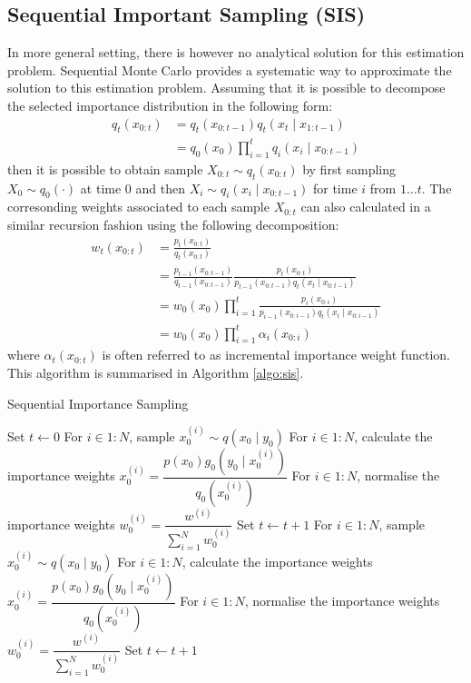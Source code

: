 \subsection{Sequential Important Sampling (SIS)}
In more general setting, there is however no analytical solution for this estimation problem. Sequential Monte Carlo provides a systematic way to approximate the solution to this estimation problem. Assuming that it is possible to decompose the selected importance distribution in the following form:
\begin{align}
	q_t(x_{0:t}) &= q_t(x_{0:t-1}) q_t(x_t \mid x_{1:t-1}) \nonumber \\
	             &= q_0(x_0) \prod^t_{i=1} q_i(x_i \mid x_{0:t-1})
\end{align}
then it is possible to obtain sample ${X_{0:t}} \sim q_t(x_{0:t})$ by first sampling $X_0 \sim q_0(\cdot)$ at time $0$ and then $X_i \sim q_i(x_i \mid x_{0:t-1})$ for time $i$ from $1 \ldots t$. The corresonding weights associated to each sample $X_{0:t}$ can also calculated in a similar recursion fashion using the following decomposition:
\begin{align}
  w_t(x_{0:t}) &= \frac{p_t(x_{0:t})}{q_t(x_{0:t})} \nonumber \\
               &= \frac{p_{t-1}(x_{0:t-1})}{q_{t-1}(x_{0:t-1})} \frac{p_t(x_{0:t})}{p_{t-1}(x_{0:t-1})q_t(x_t \mid x_{0:t-1})} \label{eq:w} \\
  &= w_0(x_0) \prod^t_{i=1} \frac{p_i(x_{0:i})}{p_{i-1}(x_{0:i-1})q_t(x_i \mid x_{0:i-1})} \nonumber \\
  &= w_0(x_0) \prod^t_{i=1} \alpha_i(x_{0:i})
\end{align}
where $\alpha_t(x_{0:t})$  is often referred to as incremental importance weight function. This algorithm is summarised in Algorithm \ref{algo:sis}.

\begin{algorithm}
\caption{Sequential Importance Sampling}\label{algo:sis}
\begin{algorithmic}[1]
\State Set $t \gets 0$
\State For $i \in 1:N$, sample $x^{(i)}_0 \sim q(x_0 \mid y_0)$
\State For $i \in 1:N$, calculate the importance weights $x^{(i)}_0 = \dfrac{p(x_0)g_0(y_0 \mid x^{(i)}_0)}{q_0(x^{(i)}_0)}$
\State For $i \in 1:N$, normalise the importance weights $w^{(i)}_0 = \dfrac{w^{(i)}}{\sum^N_{i=1} w^{(i)}_0}$
\State Set $t \gets t + 1$
  \State For $i \in 1:N$, sample $x^{(i)}_0 \sim q(x_0 \mid y_0)$
  \State For $i \in 1:N$, calculate the importance weights $x^{(i)}_0 = \dfrac{p(x_0)g_0(y_0 \mid x^{(i)}_0)}{q_0(x^{(i)}_0)}$
  \State For $i \in 1:N$, normalise the importance weights $w^{(i)}_0 = \dfrac{w^{(i)}}{\sum^N_{i=1} w^{(i)}_0}$
  \State Set $t \gets t + 1$
\EndWhile
\EndFunction
\end{algorithmic}
\end{algorithm}

